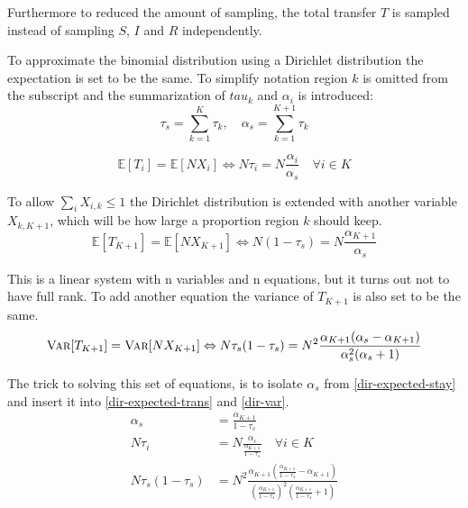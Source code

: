 Furthermore to reduced the amount of sampling, the total transfer $T$ is sampled instead of sampling $S$, $I$ and $R$ independently.

To approximate the binomial distribution using a Dirichlet distribution the expectation is set to be the same. To simplify notation region $k$ is omitted from the subscript and the summarization of $tau_k$ and $\alpha_i$ is introduced:
\begin{equation}
\tau_s = \sum_{k = 1}^{K} \tau_k, \quad \alpha_s = \sum_{k = 1}^{K+1} \tau_k
\end{equation}

\begin{equation}
\mathbb{E}[T_{i}] = \mathbb{E}[N X_i] \Leftrightarrow N \tau_i = N \frac{\alpha_i}{\alpha_s} \quad \forall i \in K
\label{dir-expected-trans}
\end{equation}

To allow $\sum_{i} X_{i,k} \le 1$ the Dirichlet distribution is extended with another variable $X_{k, K+1}$, which will be how large a proportion region $k$ should keep.
\begin{equation}
\mathbb{E}[T_{K+1}] = \mathbb{E}[N X_{K+1}] \Leftrightarrow N \left(1 - \tau_s\right) = N \frac{\alpha_{K+1}}{\alpha_s}
\label{dir-expected-stay}
\end{equation}
  
This is a linear system with n variables and n equations, but it turns out not to have full rank. To add another equation the variance of $T_{K+1}$ is also set to be the same.
\begin{equation}
\textsc{Var}[T_{K+1}] = \textsc{Var}[N X_{K+1}] \Leftrightarrow N\tau_s (1 - \tau_s) = N^2 \frac{\alpha_{K+1}(\alpha_s - \alpha_{K+1})}{\alpha_s^2 (\alpha_s + 1)}
\label{dir-var}
\end{equation}

The trick to solving this set of equations, is to isolate $\alpha_s$ from \eqref{dir-expected-stay} and insert it into \eqref{dir-expected-trans} and \eqref{dir-var}.
\begin{align}
\alpha_s &= \frac{\alpha_{K+1}}{1 - \tau_s} \label{dir-expected-intermediate} \\
N \tau_i &= N \frac{\alpha_i}{\frac{\alpha_{K+1}}{1 - \tau_s}} \quad \forall i \in K \\
N\tau_s (1 - \tau_s) &= N^2 \frac{\alpha_{K+1}\left(\frac{\alpha_{K+1}}{1 - \tau_s} - \alpha_{K+1}\right)}{\left(\frac{\alpha_{K+1}}{1 - \tau_s}\right)^2 \left(\frac{\alpha_{K+1}}{1 - \tau_s} + 1\right)} \label{dir-var-intermediate}
\end{align}

